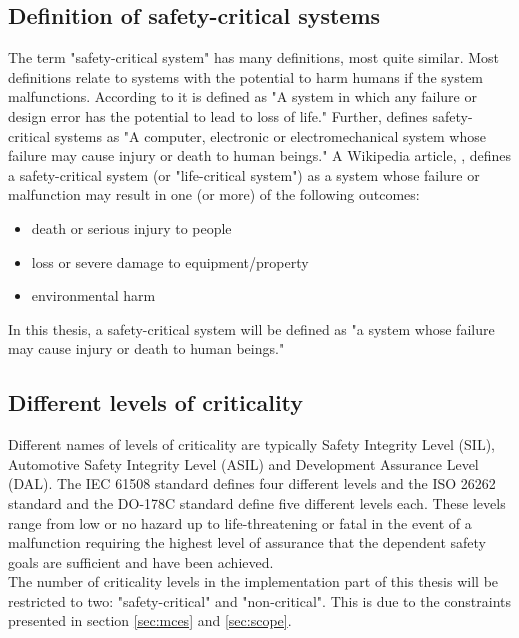 \subsection{Definition of safety-critical systems}
The term "safety-critical system" has many definitions, most quite similar. Most definitions relate to systems with the potential to harm humans if the system malfunctions. According to \cite{website:encyclopedia} it is defined as "A system in which any failure or design error has the potential to lead to loss of life." Further, \cite{website:dictionary} defines safety-critical systems as "A computer, electronic or electromechanical system whose failure may cause injury or death to human beings." A Wikipedia article, \cite{website:wikipedia}, defines a safety-critical system (or "life-critical system") as a system whose failure or malfunction may result in one (or more) of the following outcomes:
\begin{itemize}
\item death or serious injury to people
\item loss or severe damage to equipment/property
\item environmental harm
\end{itemize}
In this thesis, a safety-critical system will be defined as "a system whose failure may cause injury or death to human beings."

\subsection{Different levels of criticality}
Different names of levels of criticality are typically Safety Integrity Level (SIL), Automotive Safety Integrity Level (ASIL) and Development Assurance Level (DAL). The IEC 61508 standard \cite{IEC61508} defines four different levels and the ISO 26262 standard \cite{ISO26262} and the DO-178C standard \cite{DO178C} define five different levels each. These levels range from low or no hazard up to life-threatening or fatal in the event of a malfunction requiring the highest level of assurance that the dependent safety goals are sufficient and have been achieved.\\

The number of criticality levels in the implementation part of this thesis will be restricted to two: "safety-critical" and "non-critical". This is due to the constraints presented in section \ref{sec:mces} and \ref{sec:scope}.

